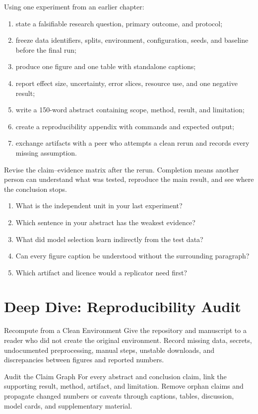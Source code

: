 \begin{practicallab}
Using one experiment from an earlier chapter:
\begin{enumerate}
    \item state a falsifiable research question, primary outcome, and protocol;
    \item freeze data identifiers, splits, environment, configuration, seeds,
          and baseline before the final run;
    \item produce one figure and one table with standalone captions;
    \item report effect size, uncertainty, error slices, resource use, and one
          negative result;
    \item write a 150-word abstract containing scope, method, result, and
          limitation;
    \item create a reproducibility appendix with commands and expected output;
    \item exchange artifacts with a peer who attempts a clean rerun and records
          every missing assumption.
\end{enumerate}
Revise the claim--evidence matrix after the rerun.
Completion means another person can understand what was tested, reproduce the
main result, and see where the conclusion stops.
\end{practicallab}

\begin{checkpoint}
\begin{enumerate}
    \item What is the independent unit in your last experiment?
    \item Which sentence in your abstract has the weakest evidence?
    \item What did model selection learn indirectly from the test data?
    \item Can every figure caption be understood without the surrounding
          paragraph?
    \item Which artifact and licence would a replicator need first?
\end{enumerate}
\end{checkpoint}

%
\section{Deep Dive: Reproducibility Audit}
\begin{v3topic}{Recompute from a Clean Environment}
Give the repository and manuscript to a reader who did not create the original
environment.
Record missing data, secrets, undocumented preprocessing, manual steps,
unstable downloads, and discrepancies between figures and reported numbers.

\end{v3topic}
\begin{v3topic}{Audit the Claim Graph}
For every abstract and conclusion claim, link the supporting result, method,
artifact, and limitation.
Remove orphan claims and propagate changed numbers or caveats through captions,
tables, discussion, model cards, and supplementary material.
\end{v3topic}

